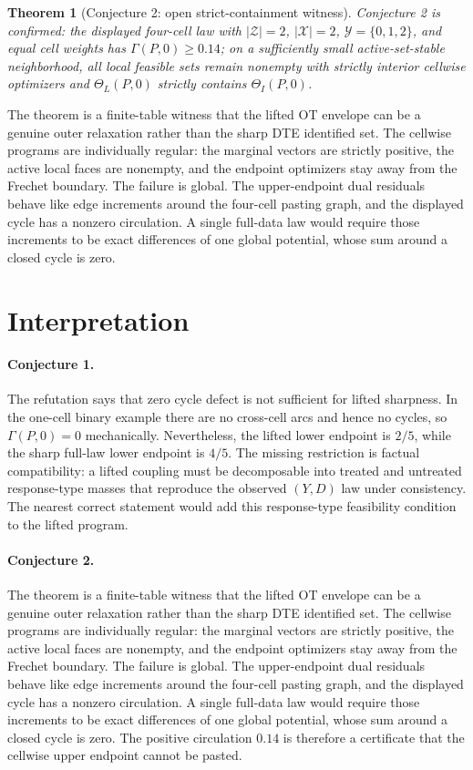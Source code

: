 \documentclass[11pt]{article}
\theoremstyle{definition}
\theoremstyle{plain}
\newtheorem{theorem}{Theorem}
\theoremstyle{remark}
\begin{document}
\begin{theorem}[Conjecture 2: open strict-containment witness]\label{thm:witness}
Conjecture 2 is confirmed: the displayed four-cell law with \(|\mathcal Z|=2\), \(|\mathcal X|=2\), \(\mathcal Y=\{0,1,2\}\), and equal cell weights has \(\Gamma(P,0)\ge 0.14\); on a sufficiently small active-set-stable neighborhood, all local feasible sets remain nonempty with strictly interior cellwise optimizers and \(\Theta_L(P,0)\) strictly contains \(\Theta_I(P,0)\).
\end{theorem}

The theorem is a finite-table witness that the lifted OT envelope can be a genuine outer relaxation rather than the sharp DTE identified set.  The cellwise programs are individually regular: the marginal vectors are strictly positive, the active local faces are nonempty, and the endpoint optimizers stay away from the Frechet boundary.  The failure is global.  The upper-endpoint dual residuals behave like edge increments around the four-cell pasting graph, and the displayed cycle has a nonzero circulation.  A single full-data law would require those increments to be exact differences of one global potential, whose sum around a closed cycle is zero.

\section{Interpretation}
\paragraph{Conjecture 1.}
The refutation says that zero cycle defect is not sufficient for lifted sharpness.  In the one-cell binary example there are no cross-cell arcs and hence no cycles, so \(\Gamma(P,0)=0\) mechanically.  Nevertheless, the lifted lower endpoint is \(2/5\), while the sharp full-law lower endpoint is \(4/5\).  The missing restriction is factual compatibility: a lifted coupling must be decomposable into treated and untreated response-type masses that reproduce the observed \((Y,D)\) law under consistency.  The nearest correct statement would add this response-type feasibility condition to the lifted program.

\paragraph{Conjecture 2.}
The theorem is a finite-table witness that the lifted OT envelope can be a genuine outer relaxation rather than the sharp DTE identified set.  The cellwise programs are individually regular: the marginal vectors are strictly positive, the active local faces are nonempty, and the endpoint optimizers stay away from the Frechet boundary.  The failure is global.  The upper-endpoint dual residuals behave like edge increments around the four-cell pasting graph, and the displayed cycle has a nonzero circulation.  A single full-data law would require those increments to be exact differences of one global potential, whose sum around a closed cycle is zero.  The positive circulation \(0.14\) is therefore a certificate that the cellwise upper endpoint cannot be pasted.
\end{document}
